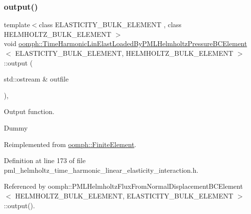 \subsubsection{\texorpdfstring{output()}{output()}\hspace{0.1cm}{\footnotesize\ttfamily [1/4]}}
{\footnotesize\ttfamily template$<$class E\+L\+A\+S\+T\+I\+C\+I\+T\+Y\+\_\+\+B\+U\+L\+K\+\_\+\+E\+L\+E\+M\+E\+NT , class H\+E\+L\+M\+H\+O\+L\+T\+Z\+\_\+\+B\+U\+L\+K\+\_\+\+E\+L\+E\+M\+E\+NT $>$ \\
void \hyperlink{classoomph_1_1TimeHarmonicLinElastLoadedByPMLHelmholtzPressureBCElement}{oomph\+::\+Time\+Harmonic\+Lin\+Elast\+Loaded\+By\+P\+M\+L\+Helmholtz\+Pressure\+B\+C\+Element}$<$ E\+L\+A\+S\+T\+I\+C\+I\+T\+Y\+\_\+\+B\+U\+L\+K\+\_\+\+E\+L\+E\+M\+E\+NT, H\+E\+L\+M\+H\+O\+L\+T\+Z\+\_\+\+B\+U\+L\+K\+\_\+\+E\+L\+E\+M\+E\+NT $>$\+::output (\begin{DoxyParamCaption}\item[{std\+::ostream \&}]{outfile }\end{DoxyParamCaption})\hspace{0.3cm}{\ttfamily [inline]}, {\ttfamily [virtual]}}



Output function. 

Dummy 

Reimplemented from \hyperlink{classoomph_1_1FiniteElement_a2ad98a3d2ef4999f1bef62c0ff13f2a7}{oomph\+::\+Finite\+Element}.



Definition at line 173 of file pml\+\_\+helmholtz\+\_\+time\+\_\+harmonic\+\_\+linear\+\_\+elasticity\+\_\+interaction.\+h.



Referenced by oomph\+::\+P\+M\+L\+Helmholtz\+Flux\+From\+Normal\+Displacement\+B\+C\+Element$<$ H\+E\+L\+M\+H\+O\+L\+T\+Z\+\_\+\+B\+U\+L\+K\+\_\+\+E\+L\+E\+M\+E\+N\+T, E\+L\+A\+S\+T\+I\+C\+I\+T\+Y\+\_\+\+B\+U\+L\+K\+\_\+\+E\+L\+E\+M\+E\+N\+T $>$\+::output().

\mbox{\label{classoomph_1_1TimeHarmonicLinElastLoadedByPMLHelmholtzPressureBCElement_a5b68e66db379729d4164df09dc00c681}} 

